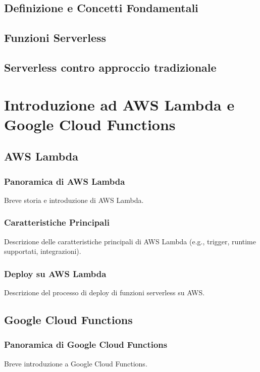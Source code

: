 \documentclass[12pt,a4paper,twoside]{book}
\begin{document}
\section{Definizione e Concetti Fondamentali}


\section{Funzioni Serverless}


\section{Serverless contro approccio tradizionale}


\chapter{Introduzione ad AWS Lambda e Google Cloud Functions}

\section{AWS Lambda}
\subsection{Panoramica di AWS Lambda}
Breve storia e introduzione di AWS Lambda.

\subsection{Caratteristiche Principali}
Descrizione delle caratteristiche principali di AWS Lambda (e.g., trigger, runtime supportati, integrazioni).

\subsection{Deploy su AWS Lambda}
Descrizione del processo di deploy di funzioni serverless su AWS.

\section{Google Cloud Functions}
\subsection{Panoramica di Google Cloud Functions}
Breve introduzione a Google Cloud Functions.
\end{document}
